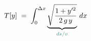 \documentclass[preview,border=2pt]{standalone}
\begin{document}
$T[y] \;=\; \displaystyle\int_{0}^{\Delta x}
\underbrace{\sqrt{\dfrac{1+y'^{2}}{2\,g\,y}}}_{\textcolor{acc}{ds/v}}\,dx$
\end{document}
